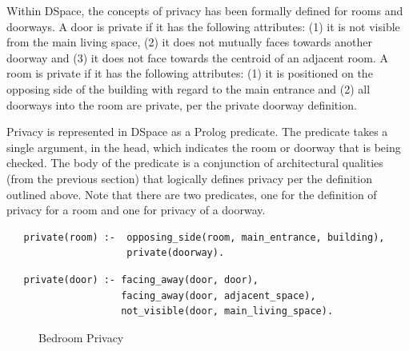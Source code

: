 \documentclass[12pt]{ucthesis}
\begin{document}
Within DSpace, the concepts of privacy has been formally defined for rooms and doorways. A door is private if it has the following attributes: (1) it is not visible from the main living space, (2) it does not mutually faces towards another doorway and (3) it does not face towards the centroid of an adjacent room. A room is private if it has the following attributes: (1) it is positioned on the opposing side of the building with regard to the main entrance and (2) all doorways into the room are private, per the private doorway definition.
 
Privacy is represented in DSpace as a Prolog predicate. The predicate takes a single argument, in the head, which indicates the room or doorway that is being checked. The body of the predicate is a conjunction of architectural qualities (from the previous section) that logically defines privacy per the definition outlined above. Note that there are two predicates, one for the definition of privacy for a room and one for privacy of a doorway.  

\begin{verbatim}
   private(room) :-  opposing_side(room, main_entrance, building), 
                     private(doorway).
\end{verbatim}  

\begin{verbatim}
   private(door) :- facing_away(door, door),
                    facing_away(door, adjacent_space),
                    not_visible(door, main_living_space). 
\end{verbatim}

\begin{figure}[H]
 \centering
  \hspace{10 mm}
 \caption{Bedroom Privacy}
\label{room-privacy}
\end{figure}
\end{document}
